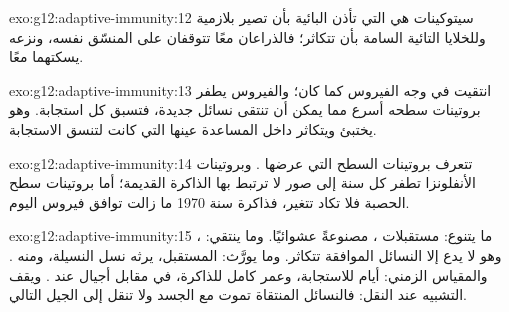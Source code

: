 \begin{solution}{exo:g12:adaptive-immunity:12}
سيتوكينات  هي التي تأذن  البائية بأن
تصير  بلازمية وللخلايا التائية السامة بأن تتكاثر؛ فالذراعان معًا
تتوقفان على المنسّق نفسه، ونزعه يسكتهما معًا.
\end{solution}

\begin{solution}{exo:g12:adaptive-immunity:13}
 انتقيت في وجه الفيروس كما كان؛ والفيروس يطفر بروتينات
سطحه أسرع مما يمكن أن تنتقى نسائل جديدة، فتسبق كل استجابة. وهو يختبئ
ويتكاثر داخل  المساعدة عينها التي كانت لتنسق الاستجابة.
\end{solution}

\begin{solution}{exo:g12:adaptive-immunity:14}
 تتعرف بروتينات السطح التي عرضها . وبروتينات
الأنفلونزا تطفر كل سنة إلى صور لا ترتبط بها الذاكرة القديمة؛ أما
بروتينات سطح الحصبة فلا تكاد تتغير، فذاكرة سنة 1970 ما زالت توافق
فيروس اليوم.
\end{solution}

\begin{solution}{exo:g12:adaptive-immunity:15}
ما يتنوع: مستقبلات ، مصنوعةً عشوائيًا. وما ينتقي: ،
وهو لا يدع إلا النسائل الموافقة تتكاثر. وما يورَّث: المستقبل، يرثه نسل
النسيلة، ومنه . والمقياس الزمني: أيام للاستجابة، وعمر
كامل للذاكرة، في مقابل أجيال عند . ويقف التشبيه عند النقل:
فالنسائل المنتقاة تموت مع الجسد ولا تنقل إلى الجيل التالي.
\end{solution}

